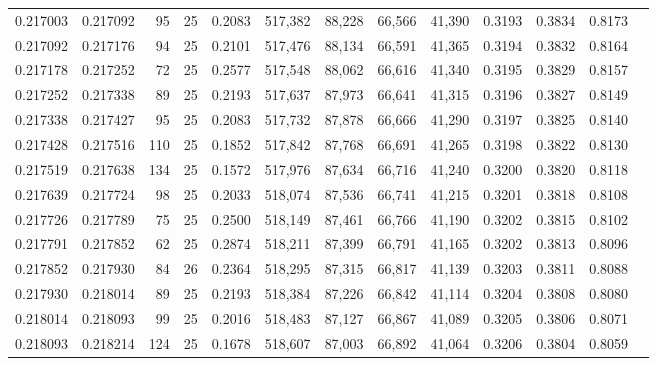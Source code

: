 \begin{tabular}{rrrrrrrrrrrrr}
0.217003 & 0.217092 &    95 &  25 &                                     0.2083 & 517,382 &  88,228 &  66,566 &  41,390 & 0.3193 & 0.3834 & 0.8173 \\
0.217092 & 0.217176 &    94 &  25 &                                     0.2101 & 517,476 &  88,134 &  66,591 &  41,365 & 0.3194 & 0.3832 & 0.8164 \\
0.217178 & 0.217252 &    72 &  25 &                                     0.2577 & 517,548 &  88,062 &  66,616 &  41,340 & 0.3195 & 0.3829 & 0.8157 \\
0.217252 & 0.217338 &    89 &  25 &                                     0.2193 & 517,637 &  87,973 &  66,641 &  41,315 & 0.3196 & 0.3827 & 0.8149 \\
0.217338 & 0.217427 &    95 &  25 &                                     0.2083 & 517,732 &  87,878 &  66,666 &  41,290 & 0.3197 & 0.3825 & 0.8140 \\
0.217428 & 0.217516 &   110 &  25 &                                     0.1852 & 517,842 &  87,768 &  66,691 &  41,265 & 0.3198 & 0.3822 & 0.8130 \\
0.217519 & 0.217638 &   134 &  25 &                                     0.1572 & 517,976 &  87,634 &  66,716 &  41,240 & 0.3200 & 0.3820 & 0.8118 \\
0.217639 & 0.217724 &    98 &  25 &                                     0.2033 & 518,074 &  87,536 &  66,741 &  41,215 & 0.3201 & 0.3818 & 0.8108 \\
0.217726 & 0.217789 &    75 &  25 &                                     0.2500 & 518,149 &  87,461 &  66,766 &  41,190 & 0.3202 & 0.3815 & 0.8102 \\
0.217791 & 0.217852 &    62 &  25 &                                     0.2874 & 518,211 &  87,399 &  66,791 &  41,165 & 0.3202 & 0.3813 & 0.8096 \\
0.217852 & 0.217930 &    84 &  26 &                                     0.2364 & 518,295 &  87,315 &  66,817 &  41,139 & 0.3203 & 0.3811 & 0.8088 \\
0.217930 & 0.218014 &    89 &  25 &                                     0.2193 & 518,384 &  87,226 &  66,842 &  41,114 & 0.3204 & 0.3808 & 0.8080 \\
0.218014 & 0.218093 &    99 &  25 &                                     0.2016 & 518,483 &  87,127 &  66,867 &  41,089 & 0.3205 & 0.3806 & 0.8071 \\
0.218093 & 0.218214 &   124 &  25 &                                     0.1678 & 518,607 &  87,003 &  66,892 &  41,064 & 0.3206 & 0.3804 & 0.8059 \\

\end{tabular}
